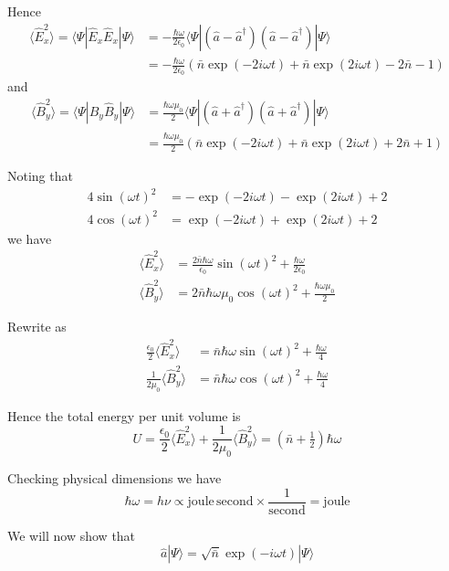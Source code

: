 \documentclass[12pt]{article}
\begin{document}
Hence
\begin{align*}
\langle\hat E_x^2\rangle
=\langle\Psi|\hat E_x\hat E_x|\Psi\rangle
&=-\frac{\hbar\omega}{2\epsilon_0}
\langle\Psi|(\hat a-\hat a^\dag)(\hat a-\hat a^\dag)|\Psi\rangle
\\
&=-\frac{\hbar\omega}{2\epsilon_0}
\left(\bar n\exp(-2i\omega t)+\bar n\exp(2i\omega t)-2\bar n-1\right)
\end{align*}
and
\begin{align*}
\langle\hat B_y^2\rangle
=\langle\Psi|\hat B_y\hat B_y|\Psi\rangle
&=\frac{\hbar\omega\mu_0}{2}
\langle\Psi|(\hat a+\hat a^\dag)(\hat a+\hat a^\dag)|\Psi\rangle
\\
&=\frac{\hbar\omega\mu_0}{2}
\left(\bar n\exp(-2i\omega t)+\bar n\exp(2i\omega t)+2\bar n+1\right)
\end{align*}

Noting that
\begin{align*}
4\sin(\omega t)^2&=-\exp(-2i\omega t)-\exp(2i\omega t)+2\\
4\cos(\omega t)^2&=\exp(-2i\omega t)+\exp(2i\omega t)+2
\end{align*}
we have
\begin{align*}
\langle\hat E_x^2\rangle
&=\frac{2\bar n\hbar\omega}{\epsilon_0}\sin(\omega t)^2+\frac{\hbar\omega}{2\epsilon_0}
\\
\langle\hat B_y^2\rangle
&=2\bar n\hbar\omega\mu_0\cos(\omega t)^2+\frac{\hbar\omega\mu_0}{2}
\end{align*}

Rewrite as
\begin{align*}
\frac{\epsilon_0}{2}\langle\hat E_x^2\rangle&=\bar n\hbar\omega\sin(\omega t)^2+\frac{\hbar\omega}{4}
\\
\frac{1}{2\mu_0}\langle\hat B_y^2\rangle&=\bar n\hbar\omega\cos(\omega t)^2+\frac{\hbar\omega}{4}
\end{align*}

Hence the total energy per unit volume is
\begin{equation*}
U=\frac{\epsilon_0}{2}\langle\hat E_x^2\rangle
+\frac{1}{2\mu_0}\langle\hat B_y^2\rangle
=\left(\bar n+\tfrac{1}{2}\right)\hbar\omega
\end{equation*}

Checking physical dimensions we have
\begin{equation*}
\hbar\omega=h\nu\propto\text{joule}\,\text{second}\times\frac{1}{\text{second}}=\text{joule}
\end{equation*}

We will now show that
\begin{equation*}
\hat a|\Psi\rangle=\sqrt{\bar n}\exp(-i\omega t)|\Psi\rangle
\end{equation*}
\end{document}
